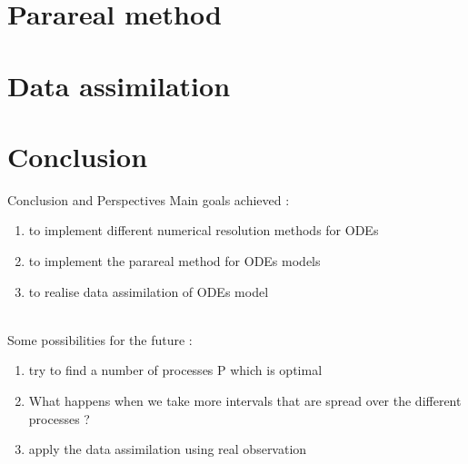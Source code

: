 \documentclass[10pt,xcolor={table,dvipsnames},t]{beamer}
\begin{document}
	\section{Parareal method}

	
	
	\section{Data assimilation}
	
	
	
	\section{Conclusion}
	
	\begin{frame}{Conclusion and Perspectives}
		Main goals achieved :
		\begin{enumerate}[\textbullet]
			\item to implement different numerical resolution methods for ODEs
			\item to implement the parareal method for ODEs models
			\item to realise data assimilation of ODEs model
		\end{enumerate} \; \\
	
		Some possibilities for the future :
		\begin{enumerate}[\textbullet]
			\item try to find a number of processes P which is optimal
			\item What happens when we take more intervals that are spread over the different processes ?
			\item apply the data assimilation using real observation 
		\end{enumerate}
	\end{frame}
	
\end{document}
